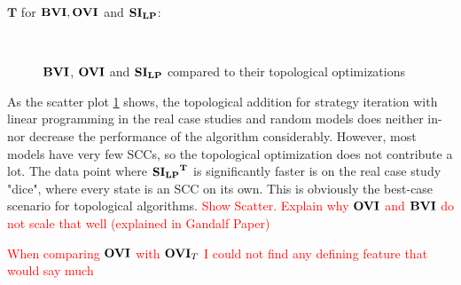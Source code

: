 $\mathbf{T}$ for $\mathbf{BVI}, \mathbf{OVI}$ and $\mathbf{SI_{LP}}$:
\begin{figure}[h!]
    \centering
    \
    \caption{$\mathbf{BVI}$, $\mathbf{OVI}$ and $\mathbf{SI_{LP}}$ compared to their topological optimizations}%
    \label{fig:Scatter_T}%
    \end{figure}
\FloatBarrier

As the scatter plot \ref{fig:Scatter_T} shows,
the topological addition for strategy iteration with linear programming in the real case studies and random models does 
neither in- nor decrease the performance of the algorithm considerably.
However, most models have very few SCCs, so the topological optimization does not contribute a lot.
The data point where $\mathbf{\mathbf{SI_{LP}}^T}$ is significantly faster is on the real case study "dice", where every state is an SCC on its own.
This is obviously the best-case scenario for topological algorithms.
\textcolor{red}{Show Scatter.
Explain why $\mathbf{OVI}$ and $\mathbf{BVI}$ do not scale that well (explained in Gandalf Paper)}

\textcolor{red}{When comparing $\mathbf{OVI}$ with $\mathbf{OVI}_T$ I could not find any defining feature that would say much}

